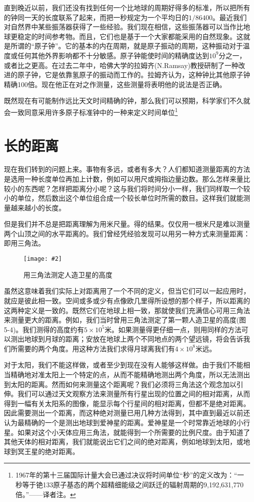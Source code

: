 \documentclass[12pt,oneside]{book}
\newenvironment{fig}[2][1]
{\begin{figure}[H]
\centering
\texttt{[image: \#2]}}
{\end{figure}}
\begin{document}
直到晚近以前，我们还没有找到任何一个比地球的周期好得多的标准，所以把所有的钟同一天的长度联系了起来，而把一秒规定为一个平均日的$  1/86400$。最近我们对自然界中某些振荡器获得了一些经验。我们现在相信，这些振荡器可以当作比地球更稳定的时间参考物。而且，它们也是基于一个大家都能采用的自然现象。这就是所谓的“原子钟”。它的基本的内在周期，就是原子振动的周期，这种振动对于温度或任何其他外界影响都不十分敏感。原子钟能使时间的精确度达到$ 10^9 $分之一，或者比之更高。在过去二年中，哈佛大学的拉姆齐(N.Ramsay)教授研制了一种改进的原子钟，它是依靠氢原子的振动而工作的。拉姆齐认为，这种钟比其他原子钟精确100倍。现在他正在对之作测量，这些测量将表明他的说法是否正确。

既然现在有可能制作远比天文时间精确的钟，那么我们可以预期，科学家们不久就会一致同意采用许多原子标准钟中的一种来定义时间单位\footnote{1967年的第十三届国际计量大会已通过决议将时间单位“秒”的定义改为：“一秒等于铯133原子基态的两个超精细能级之间跃迁的辐射周期的9,192,631,770倍。”——译者注。}



\section{长的距离}
现在我们转到的问题上来。事物有多远，或者有多大？人们都知道测量距离的方法是选用一种长度单位再加上计数，例如可以用尺或拇指边量边数。那么怎样来量比较小的东西呢？怎样把距离分小呢？这与我们将时间分小一样，我们同样取一个较小的单位，然后数出这个单位组合成一个较长单位时所需的数目。这样我们就能测量越来越小的长度。

但是我们并不总是把距离理解为用米尺量。得的结果。仅仅用一根米尺是难以测量两个山顶之间的水平距离的。我们曾经凭经验发现可以用另一种方式来测量距离：即用三角法。
\begin{fig}{用三角法测定人造卫星的高度}
\caption{用三角法测定人造卫星的高度}
\label{fig:用三角法测定人造卫星的高度}
\end{fig}
虽然这意味着我们实际上对距离用了一个不同的定义，但当它们可以一起应用时，就应是彼此相一致。空间或多或少有点像欧几里得所设想的那个样子，所以距离的这两种定义是一致的。既然它们在地球上相一致，那就使我们充满信心可用三角法来测量更大的距离。例如，我们当时曾用三角法测定了第一颗人造卫星的高度(图5-4)。我们测得的高度约有$ 5\times 10^5$米。如果测量得更仔细一点，则用同样的方法可以测出地球到月球的距离；安放在地球上两个不同地点的两个望远镜，将会告诉我们所需要的两个角度。用这种方法我们求得月球离我们有$ 4 \times 10^8 $米远。

对于太阳，我们不能这样做，或者至少到现在没有人能够这样做。由于我们不能相当精确地对准太阳上一个特定的点，从而不能精确地测出两个角度，所以无法测出到太阳的距离。然而如何来测量这个距离呢？我们必须将三角法这个观念加以引伸。我们可以通过天文观察方法来测量所有行星出现的位置之间的相对距离，从而得到一幅有关太阳系的图像，能显示每个行星间的相对距离，但都不是绝对距离。因此需要测出一个距离，而这种绝对测量已用几种方法得到，其中直到最近以前还认为最精确的一个是测出地球到爱神星的距离。爱神星是一个时常靠近地球的小行星。如果对这个小天体应用三角法，就能得到一个所需要的比例尺度。由于知道了其他天体的相对距离，我们就能说出它们之间的绝对距离，例如地球到太阳，或地球到冥王星的绝对距离。
\end{document}

